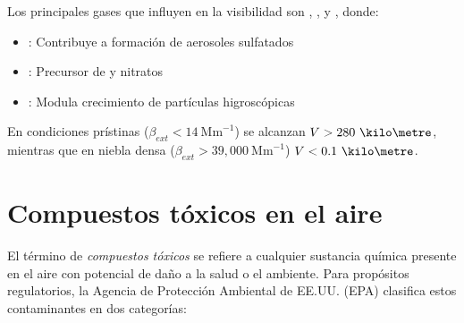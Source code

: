 Los principales gases que influyen en la visibilidad son , , y , donde:
\begin{itemize}
    \item {}: Contribuye a formación de aerosoles sulfatados
    \item {}: Precursor de  y nitratos
    \item {}: Modula crecimiento de partículas higroscópicas
\end{itemize}

En condiciones prístinas ($\beta_{ext} < 14\ \text{Mm}^{-1}$) se alcanzan $V > 280\ \kilo\metre$, mientras que en niebla densa ($\beta_{ext} > 39,000\ \text{Mm}^{-1}$) $V < 0.1\ \kilo\metre$.

\section{Compuestos t\'oxicos en el aire}
\label{ctox}
\normalsize
El término de \emph{compuestos tóxicos} se refiere a cualquier sustancia química presente en el aire con potencial de daño a la salud o el ambiente. Para propósitos regulatorios, la Agencia de Protección Ambiental de EE.UU. (EPA) clasifica estos contaminantes en dos categorías:

